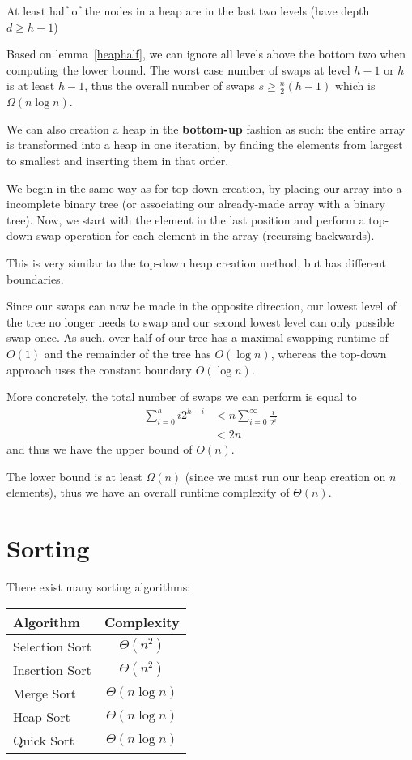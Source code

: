 \documentclass[12pt]{article}
\begin{document}
\begin{lemma}
\label{heaphalf}
At least half of the nodes in a heap are in the last two levels (have depth $d \geq h - 1$)
\end{lemma}

Based on lemma~\ref{heaphalf}, we can ignore all levels above the bottom two when computing the lower bound. The worst case number of swaps at level $h-1$ or $h$ is at least $h-1$, thus the overall number of swaps $s \geq \frac{n}{2} (h-1)$ which is $\Omega(n\log n)$.

We can also creation a heap in the {\bf bottom-up} fashion as such: the entire array is transformed into a heap in one iteration, by finding the elements from largest to smallest and inserting them in that order.

We begin in the same way as for top-down creation, by placing our array into a incomplete binary tree (or associating our already-made array with a binary tree). Now, we start with the element in the last position and perform a top-down swap operation for each element in the array (recursing backwards).

This is very similar to the top-down heap creation method, but has different boundaries.

Since our swaps can now be made in the opposite direction, our lowest level of the tree no longer needs to swap and our second lowest level can only possible swap once. As such, over half of our tree has a maximal swapping runtime of $O(1)$ and the remainder of the tree has $O(\log n)$, whereas the top-down approach uses the constant boundary $O(\log n)$.

More concretely, the total number of swaps we can perform is equal to
\begin{align*}
\sum_{i=0}^h i2^{h-i} &< n\sum_{i=0}^\infty \frac{i}{2^i}\\
&< 2n
\end{align*}
and thus we have the upper bound of $O(n)$.

The lower bound is at least $\Omega(n)$ (since we must run our heap creation on $n$ elements), thus we have an overall runtime complexity of $\Theta(n)$.

\section{Sorting}
There exist many sorting algorithms:
\begin{table}[ht]
\centering
  \begin{tabular}{|l|c|}
  \hline
  Algorithm & Complexity \\
  \hline
  \hline
  Selection Sort & $\Theta(n^2)$ \\
  Insertion Sort & $\Theta(n^2)$ \\
  Merge Sort & $\Theta(n\log n)$ \\
  Heap Sort & $\Theta(n\log n)$ \\
  Quick Sort & $\Theta(n\log n)$ \\
  \hline
  \end{tabular}
\end{table}
\end{document}
